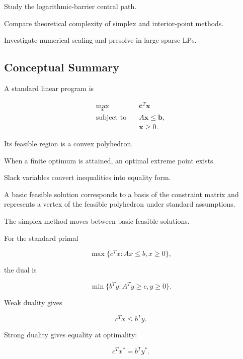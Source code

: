\begin{exercise}[4]
Study the logarithmic-barrier central path.
\end{exercise}

\begin{exercise}[4]
Compare theoretical complexity of simplex and interior-point methods.
\end{exercise}

\begin{exercise}[4]
Investigate numerical scaling and presolve in large sparse LPs.
\end{exercise}

\subsection{Conceptual Summary}
\label{subsec:linear-programming-summary}

A standard linear program is

\[
\boxed{
\begin{aligned}
\max_{\mathbf{x}}
\quad&
\mathbf{c}^T\mathbf{x}
\\
\text{subject to}
\quad&
A\mathbf{x}\leq\mathbf{b},
\\
&
\mathbf{x}\geq0.
\end{aligned}
}
\]

Its feasible region is a convex polyhedron.

When a finite optimum is attained, an optimal extreme point exists.

Slack variables convert inequalities into equality form.

A basic feasible solution corresponds to a basis of the constraint matrix
and represents a vertex of the feasible polyhedron under standard
assumptions.

The simplex method moves between basic feasible solutions.

For the standard primal

\[
\boxed{
\max
\{
c^Tx:
Ax\leq b,
x\geq0
\},
}
\]

the dual is

\[
\boxed{
\min
\{
b^Ty:
A^Ty\geq c,
y\geq0
\}.
}
\]

Weak duality gives

\[
\boxed{
c^Tx
\leq
b^Ty.
}
\]

Strong duality gives equality at optimality:

\[
\boxed{
c^Tx^*
=
b^Ty^*.
}
\]

